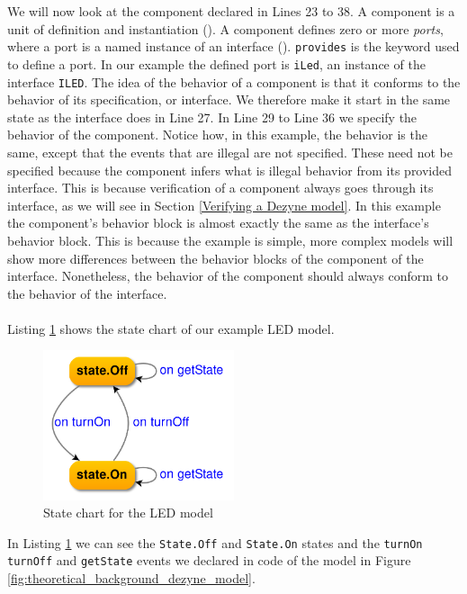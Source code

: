 \documentclass[12pt]{scrreprt}
\begin{document}
We will now look at the component declared in Lines 23 to 38. A component is a unit of definition and instantiation (\cite{dzngloss}). A component defines zero or more \textit{ports}, where a port is a named instance of an interface (\cite{dzngloss}). \texttt{provides} is the keyword used to define a port. In our example the defined port is \texttt{iLed}, an instance of the interface \texttt{ILED}. The idea of the behavior of a component is that it conforms to the behavior of its specification, or interface. We therefore make it start in the same state as the interface does in Line 27. In Line 29 to Line 36 we specify the behavior of the component. Notice how, in this example, the behavior is the same, except that the events that are illegal are not specified. These need not be specified because the component infers what is illegal behavior from its provided interface. This is because verification of a component always goes through its interface, as we will see in Section \ref{Verifying a Dezyne model}. In this example the component's behavior block is almost exactly the same as the interface's behavior block. This is because the example is simple, more complex models will show more differences between the behavior blocks of the component of the interface. Nonetheless, the behavior of the component should always conform to the behavior of the interface.
\\\\
Listing \ref{fig:led_example_graph} shows the state chart of our example LED model.

\begin{figure}[H]
    \centering
    \includegraphics[width=0.5\textwidth]{Figures/theoretical_background/led_example_graph.png}
    \caption{State chart for the LED model}
    \label{fig:led_example_graph}
\end{figure}

In Listing \ref{fig:led_example_graph} we can see the \texttt{State.Off} and \texttt{State.On} states and  the \texttt{turnOn} \texttt{turnOff} and \texttt{getState} events we declared in code of the model in Figure \ref{fig:theoretical_background_dezyne_model}.
\end{document}
